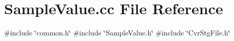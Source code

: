 \section{Sample\+Value.\+cc File Reference}
\label{SampleValue_8cc}
{\ttfamily \#include \char`\"{}common.\+h\char`\"{}}\newline
{\ttfamily \#include \char`\"{}Sample\+Value.\+h\char`\"{}}\newline
{\ttfamily \#include \char`\"{}Cvr\+Stg\+File.\+h\char`\"{}}\newline
